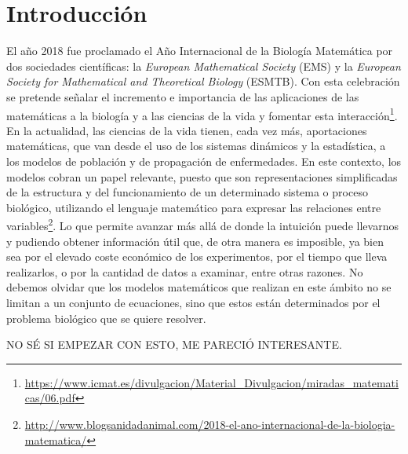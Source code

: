 \chapter{Introducción}
\label{cap:introduccion}


El año 2018 fue proclamado el Año Internacional de la Biología Matemática por dos sociedades científicas: la \textit{European Mathematical Society} (EMS) y la \textit{European Society for Mathematical and Theoretical Biology} (ESMTB). Con esta celebración se pretende señalar el incremento e importancia de las aplicaciones de las matemáticas a la biología y a las ciencias de la vida y fomentar esta interacción\footnote{\url{https://www.icmat.es/divulgacion/Material_Divulgacion/miradas_matematicas/06.pdf}}. En la actualidad, las ciencias de la vida tienen, cada vez más, aportaciones matemáticas, que van desde el uso de los sistemas dinámicos y la estadística, a los modelos de población y de propagación de enfermedades. En este contexto, los modelos cobran un papel relevante, puesto que son representaciones simplificadas de la estructura y del funcionamiento de un determinado sistema o proceso biológico, utilizando el lenguaje matemático para expresar las relaciones entre variables\footnote{\url{http://www.blogsanidadanimal.com/2018-el-ano-internacional-de-la-biologia-matematica/}}. Lo que permite avanzar más allá de donde la intuición puede llevarnos y pudiendo obtener información útil que, de otra manera es imposible, ya bien sea por el elevado coste económico de los experimentos, por el tiempo que lleva realizarlos, o por la cantidad de datos a examinar, entre otras razones. No debemos olvidar que los modelos matemáticos que realizan en este ámbito no se limitan a un conjunto de ecuaciones, sino que estos están determinados por el problema biológico que se quiere resolver.

NO SÉ SI EMPEZAR CON ESTO, ME PARECIÓ INTERESANTE.

